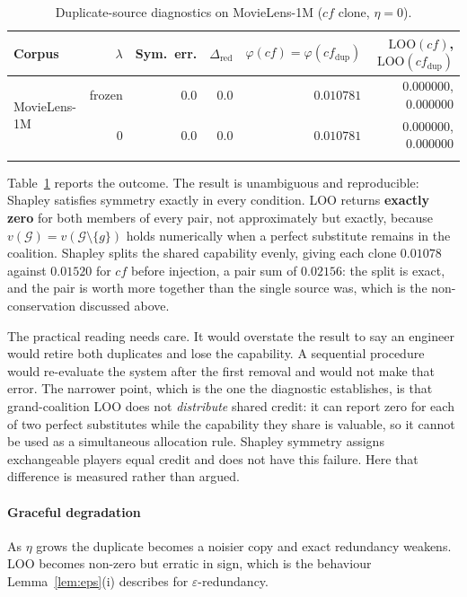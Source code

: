 \documentclass[pdflatex,sn-basic,Numbered]{sn-jnl}
\theoremstyle{plain}
\theoremstyle{definition}
\newcommand{\G}{\mathcal{G}}
\newcommand{\LOO}{\mathrm{LOO}}
\begin{document}
\begin{table}[tbp]
\caption{Duplicate-source diagnostics on MovieLens-1M ($cf$ clone,
$\eta=0$).}
\label{tab:recovery}
\begin{tabular}{@{}lrrrrr@{}}
\toprule
Corpus & $\lambda$ & Sym.\ err. & $\Delta_{\mathrm{red}}$ &
$\varphi(cf) = \varphi(cf_{\mathrm{dup}})$ &
$\LOO(cf)$, $\LOO(cf_{\mathrm{dup}})$ \\
\midrule
\multirow{2}{*}{MovieLens-1M} & frozen & $0.0$ & $0.0$ & $0.010781$ & $0.000000$, $0.000000$ \\
                              & $0$    & $0.0$ & $0.0$ & $0.010781$ & $0.000000$, $0.000000$ \\
\botrule
\end{tabular}
\end{table}

Table~\ref{tab:recovery} reports the outcome. The result is unambiguous and
reproducible: Shapley satisfies symmetry exactly
in every condition. LOO returns \textbf{exactly zero} for both members of every pair, not approximately but exactly, because $v(\G) = v(\G \setminus \{g\})$ holds numerically when a perfect substitute
remains in the coalition. Shapley splits the shared capability evenly, giving
each clone $0.01078$ against $0.01520$ for $cf$ before injection, a pair sum of
$0.02156$: the split is exact, and the pair is worth more together than the
single source was, which is the non-conservation discussed above.

The practical reading needs care. It would overstate the result to say an
engineer would retire both duplicates and lose the capability. A
sequential procedure would re-evaluate the system after the first removal and
would not make that error. The narrower point, which is the one the diagnostic
establishes, is that grand-coalition LOO does not \emph{distribute} shared
credit: it can report zero for each of two perfect substitutes while the
capability they share is valuable, so it cannot be used as a simultaneous
allocation rule. Shapley symmetry assigns exchangeable players equal credit and
does not have this failure. Here that difference is measured rather than
argued.

\paragraph{Graceful degradation}
As $\eta$ grows the duplicate becomes a noisier copy and exact redundancy
weakens. LOO becomes non-zero but erratic in sign, which is the behaviour
Lemma~\ref{lem:eps}(i) describes for $\varepsilon$-redundancy.
\end{document}
